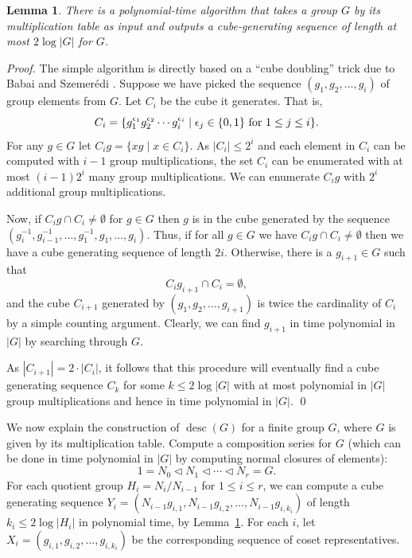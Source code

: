\documentclass{elsarticle}
\newtheorem{lemma}[theorem]{Lemma}
\newcommand{\desc}{\mathop{\mathrm{desc}}}
\begin{document}
\begin{lemma}\label{cgs-find}
  There is a polynomial-time algorithm that takes a group $G$ by its
  multiplication table as input and outputs a cube-generating sequence
  of length at most $2\log |G|$ for $G$.
\end{lemma}

\begin{proof}
  The simple algorithm is directly based on a ``cube doubling'' trick
  due to Babai and Szemer\'{e}di \cite{BSz84}. Suppose we have picked
  the sequence $(g_1,g_2,\ldots,g_i)$ of group elements from $G$. Let
  $C_i$ be the cube it generates. That is,
\[
C_i=\{g_1^{\epsilon_1}g_2^{\epsilon_2}\cdots g_i^{\epsilon_i}\mid \epsilon_j\in\{0,1\}
\hbox{ for } 1\le j \le i\}.
\]
For any $g\in G$ let $C_ig=\{xg\mid x\in C_i\}$. As $|C_i|\le 2^i$ and
each element in $C_i$ can be computed with $i-1$ group
multiplications, the set $C_i$ can be enumerated with at most
$(i-1)2^i$ many group multiplications. We can enumerate $C_ig$ with
$2^i$ additional group multiplications.

Now, if $C_ig\cap C_i\ne \emptyset$ for $g\in G$ then $g$ is in the
cube generated by the sequence
$(g_i^{-1},g_{i-1}^{-1},\ldots,g_1^{-1},g_1,\ldots,g_i)$. Thus, if for all
$g\in G$ we have $C_ig\cap C_i\ne \emptyset$ then we have a cube generating
sequence of length $2i$. Otherwise, there is a $g_{i+1}\in G$ such
that
\[
C_ig_{i+1}\cap C_i = \emptyset,
\]
and the cube $C_{i+1}$ generated by $(g_1,g_2,\ldots,g_{i+1})$ is
twice the cardinality of $C_i$ by a simple counting argument. Clearly,
we can find $g_{i+1}$ in time polynomial in $|G|$ by searching through
$G$.

As $|C_{i+1}|=2\cdot |C_i|$, it follows that this procedure will
eventually find a cube generating sequence $C_k$ for some
$k\le 2\log|G|$ with at most polynomial in $|G|$ group multiplications
and hence in time polynomial in $|G|$.  \qed
\end{proof}

We now explain the construction of $\desc(G)$ for a finite group $G$,
where $G$ is given by its multiplication table.  Compute a composition
series for $G$ (which can be done in time polynomial in $|G|$ by
computing normal closures of elements):
  \[
1=N_0\lhd N_1\lhd \cdots \lhd N_r=G.
\]
For each quotient group $H_i=N_i/N_{i-1}$ for $1\le i\le r$, we can
compute a cube generating sequence
$Y_i=(N_{i-1}g_{i,1},N_{i-1}g_{i,2},\ldots,N_{i-1}g_{i,k_i})$ of length
$k_i\le 2\log |H_i|$ in polynomial time, by Lemma~\ref{cgs-find}.  For
each $i$, let $X_i=(g_{i,1},g_{i,2},\ldots,g_{i,k_i})$ be the
corresponding sequence of coset representatives.
\end{document}
